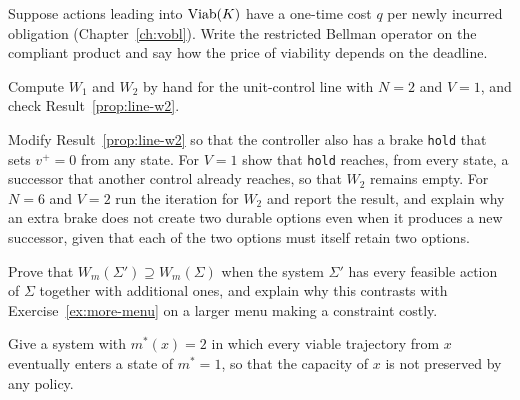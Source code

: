 \begin{exercise}
Suppose actions leading into $\operatorname{Viab}(K)$ have a one-time cost $q$ per newly incurred obligation (Chapter~\ref{ch:vobl}). Write the restricted Bellman operator on the compliant product and say how the price of viability depends on the deadline.
\end{exercise}

\begin{exercise}
Compute $W_1$ and $W_2$ by hand for the unit-control line with $N=2$ and $V=1$, and check Result~\ref{prop:line-w2}.
\end{exercise}

\begin{exercise}
Modify Result~\ref{prop:line-w2} so that the controller also has a brake \texttt{hold} that sets $v^{+}=0$ from any state. For $V=1$ show that \texttt{hold} reaches, from every state, a successor that another control already reaches, so that $W_2$ remains empty. For $N=6$ and $V=2$ run the iteration for $W_2$ and report the result, and explain why an extra brake does not create two durable options even when it produces a new successor, given that each of the two options must itself retain two options.\label{ex:hold}
\end{exercise}

\begin{exercise}
Prove that $W_m(\Sigma')\supseteq W_m(\Sigma)$ when the system $\Sigma'$ has every feasible action of $\Sigma$ together with additional ones, and explain why this contrasts with Exercise~\ref{ex:more-menu} on a larger menu making a constraint costly.
\end{exercise}

\begin{exercise}
Give a system with $m^{*}(x)=2$ in which every viable trajectory from $x$ eventually enters a state of $m^{*}=1$, so that the capacity of $x$ is not preserved by any policy.
\end{exercise}

